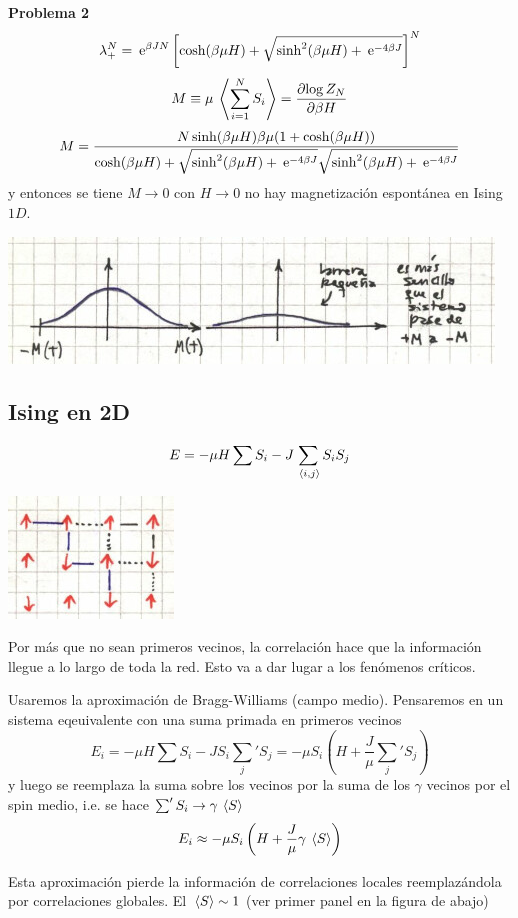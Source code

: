 \documentclass[10pt,oneside]{CBFT_book}
\begin{document}
\begin{ejemplo}{\bf Problema 2}
\[
	\lambda^N_+ = \:\mathrm{e}^{\beta J N}
	\left[ \cosh(\beta \mu H) + \sqrt{ \sinh^2(\beta \mu H) + \:\mathrm{e}^{-4\beta J} } \right]^N
\]
\[
	M \equiv \mu \:\left\langle  \sum_{i=1}^N S_i  \right\rangle = \frac{\partial^{\hspace{-0.05em}} {\log Z_N}}{\partial {\beta H}^{\hspace{-0.05em}}}
\]
\[
	M = \frac{ N \sinh(\beta \mu H) \beta \mu ( 1 + \cosh (\beta \mu H) ) }
	{  \cosh(\beta \mu H) + \sqrt{ \sinh^2(\beta \mu H) + \:\mathrm{e}^{-4\beta J} } 
	\sqrt{ \sinh^2(\beta \mu H) + \:\mathrm{e}^{-4\beta J} } }
\]
y entonces se tiene $M \to 0$ con $H \to 0$ no hay magnetización espontánea en Ising $1D$.

\includegraphics[scale=0.5]{images/1606337147.jpg}

\end{ejemplo}

\subsection{Ising en 2D}

\[
	E = - \mu H \sum S_i - J \sum_{\:\left\langle i,j \right\rangle} S_i S_j
\]

\includegraphics[scale=0.5]{images/1606337150.jpg}

Por más que no sean primeros vecinos, la correlación hace que la información llegue a lo largo de toda la red.
Esto va a dar lugar a los fenómenos críticos.

Usaremos la aproximación de Bragg-Williams (campo medio). Pensaremos en un sistema eqeuivalente
con una suma primada en primeros vecinos
\[
	E_i = - \mu H \sum S_i - J S_i \sum_{j}' S_j =
	- \mu S_i \left( H + \frac{J}{\mu} \sum_{j}' S_j \right) 
\]
y luego se reemplaza la suma sobre los vecinos por la suma de los $\gamma$ vecinos por el spin medio,
i.e. se hace $\sum' S_i \to \gamma \:\left\langle S \right\rangle$
\[
	E_i \approx -\mu S_i \left( H + \frac{J}{\mu} \gamma \:\left\langle S \right\rangle \right) 
\]

Esta aproximación pierde la información de correlaciones locales reemplazándola por correlaciones globales.
El $\:\left\langle S \right\rangle \sim 1$ (ver primer panel en la figura de abajo)
\end{document}
